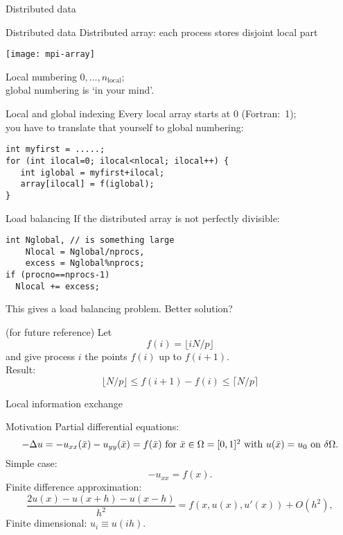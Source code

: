  {Distributed data}

\begin{numberedframe}{Distributed data}
  Distributed array: each process stores disjoint local part
  
  \texttt{[image: mpi-array]}

  Local numbering $0,\ldots,n_{\mathrm{local}}$;\\
  global numbering is `in your mind'.
\end{numberedframe}

\begin{numberedframe}{Local and global indexing}
  Every local array starts at 0 (Fortran:~1);\\
  you have to translate that yourself to global numbering:
\lstset{language=C}
\begin{lstlisting}
int myfirst = .....;
for (int ilocal=0; ilocal<nlocal; ilocal++) {
   int iglobal = myfirst+ilocal;
   array[ilocal] = f(iglobal);
}  
\end{lstlisting}
\end{numberedframe}

\begin{optexerciseframe}
  
\end{optexerciseframe}

\begin{numberedframe}{Load balancing}
If the distributed array is not perfectly divisible:
\lstset{language=C}
\begin{lstlisting}
int Nglobal, // is something large
    Nlocal = Nglobal/nprocs,
    excess = Nglobal%nprocs;
if (procno==nprocs-1) 
  Nlocal += excess;
\end{lstlisting}
This gives a load balancing problem. Better solution?
\end{numberedframe}

\begin{numberedframe}{(for future reference)}
Let
\[ f(i)=\lfloor iN/p\rfloor \]
and give process $i$ the points $f(i)$ up to $f(i+1)$. \\
Result:
\[ \lfloor N/p\rfloor \leq f(i+1)-f(i)\leq \lceil N/p\rceil \]
\end{numberedframe}

 {Local information exchange}

\begin{numberedframe}{Motivation}
  Partial differential equations:
  \[
    \hbox{$-\Delta u = -u_{xx}(\bar x)-u_{yy}(\bar x)=f(\bar x)$ for
      $\bar x\in\Omega=[0,1]^2$ 
      with $u(\bar x)=u_0$ on $\delta\Omega$.}
    \]
  Simple case:
  \[ -u_{xx}=f(x). \]
  Finite difference approximation:
  \[ \frac{2u(x)-u(x+h)-u(x-h)}{h^2}=f(x,u(x),u'(x))+O(h^2), \]
  Finite dimensional: $u_i\equiv u(ih)$.
\end{numberedframe}


